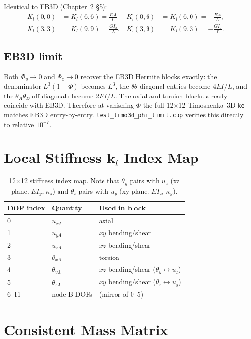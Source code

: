 \documentclass[11pt,a4paper]{article}
\newcommand{\bmath}[1]{\boldsymbol{#1}}
\begin{document}
Identical to EB3D (Chapter~2 \S5):
\begin{align*}
K_l(0,0) &= K_l(6,6) = \tfrac{EA}{L}, & K_l(0,6) &= K_l(6,0) = -\tfrac{EA}{L}, \\
K_l(3,3) &= K_l(9,9) = \tfrac{G I_x}{L}, & K_l(3,9) &= K_l(9,3) = -\tfrac{G I_x}{L}.
\end{align*}

\subsection{EB3D limit}

Both $\Phi_y \to 0$ and $\Phi_z \to 0$ recover the EB3D Hermite blocks exactly: the denominator $L^3(1+\Phi)$ becomes $L^3$, the $\theta\theta$ diagonal entries become $4 EI/L$, and the $\theta_A\theta_B$ off-diagonals become $2 EI/L$. The axial and torsion blocks already coincide with EB3D. Therefore at vanishing $\Phi$ the full 12$\times$12 Timoshenko~3D \texttt{ke} matches EB3D entry-by-entry. \texttt{test\_timo3d\_phi\_limit.cpp} verifies this directly to relative $10^{-7}$.

\section{Local Stiffness $\bmath{k}_l$ Index Map}

\begin{table}[h!]
\centering
\begin{tabular}{l l l}
\toprule
DOF index & Quantity & Used in block \\
\midrule
0 & $u_{xA}$ & axial \\
1 & $u_{yA}$ & $xy$ bending/shear \\
2 & $u_{zA}$ & $xz$ bending/shear \\
3 & $\theta_{xA}$ & torsion \\
4 & $\theta_{yA}$ & $xz$ bending/shear ($\theta_y \leftrightarrow u_z$) \\
5 & $\theta_{zA}$ & $xy$ bending/shear ($\theta_z \leftrightarrow u_y$) \\
6--11 & node-B DOFs & (mirror of 0--5) \\
\bottomrule
\end{tabular}
\caption{12$\times$12 stiffness index map. Note that $\theta_y$ pairs with $u_z$ (xz plane, $E I_y$, $\kappa_z$) and $\theta_z$ pairs with $u_y$ (xy plane, $E I_z$, $\kappa_y$).}
\end{table}

\section{Consistent Mass Matrix}\label{sec:mass}
\end{document}
